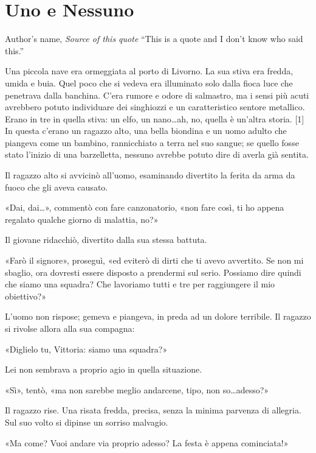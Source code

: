 \chapter{Uno e Nessuno}

\begin{chapquote}{Author's name, \textit{Source of this quote}}
``This is a quote and I don't know who said this.''
\end{chapquote}


Una piccola nave era ormeggiata al porto di Livorno. La sua stiva era fredda, umida e buia. Quel poco che si vedeva era illuminato solo dalla fioca luce che penetrava dalla banchina. C'era rumore e odore di salmastro, ma i sensi più acuti avrebbero potuto individuare dei singhiozzi e un caratteristico sentore metallico. Erano in tre in quella stiva: un elfo, un nano\ldots ah, no, quella è un'altra storia. [1] In questa c'erano un ragazzo alto, una bella biondina e un uomo adulto che piangeva come un bambino, rannicchiato a terra nel suo sangue; se quello fosse stato l'inizio di una barzelletta, nessuno avrebbe potuto dire di averla già sentita.

Il ragazzo alto si avvicinò all'uomo, esaminando divertito la ferita da arma da fuoco che gli aveva causato.

«Dai, dai\ldots», commentò con fare canzonatorio, «non fare così, ti ho appena regalato qualche giorno di malattia, no?»

Il giovane ridacchiò, divertito dalla sua stessa battuta.

«Farò il signore», proseguì, «ed eviterò di dirti che ti avevo avvertito. Se non mi sbaglio, ora dovresti essere disposto a prendermi sul serio. Possiamo dire quindi che siamo una squadra? Che lavoriamo tutti e tre per raggiungere il mio obiettivo?»

L'uomo non rispose; gemeva e piangeva, in preda ad un dolore terribile. Il ragazzo si rivolse allora alla sua compagna:

«Diglielo tu, Vittoria: siamo una squadra?»

Lei non sembrava a proprio agio in quella situazione.

«Sì», tentò, «ma non sarebbe meglio andarcene, tipo, non so\ldots adesso?»

Il ragazzo rise. Una risata fredda, precisa, senza la minima parvenza di allegria. Sul suo volto si dipinse un sorriso malvagio.

«Ma come? Vuoi andare via proprio adesso? La festa è appena cominciata!»

